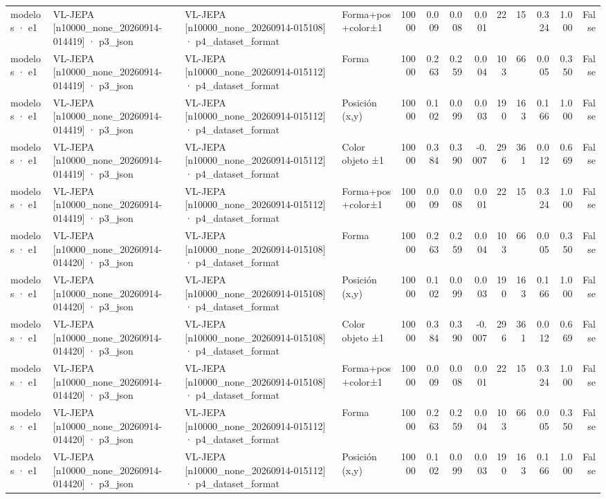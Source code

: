 \begin{tabular}{llllrrrrrrrrr}
modelos · e1 & VL-JEPA [n10000\_none\_20260914-014419] · p3\_json & VL-JEPA [n10000\_none\_20260914-015108] · p4\_dataset\_format & Forma+pos+color±1 & 10000 & 0.009 & 0.008 & 0.001 & 22 & 15 & 0.324 & 1.000 & False \\
modelos · e1 & VL-JEPA [n10000\_none\_20260914-014419] · p3\_json & VL-JEPA [n10000\_none\_20260914-015112] · p4\_dataset\_format & Forma & 10000 & 0.263 & 0.259 & 0.004 & 103 & 66 & 0.005 & 0.350 & False \\
modelos · e1 & VL-JEPA [n10000\_none\_20260914-014419] · p3\_json & VL-JEPA [n10000\_none\_20260914-015112] · p4\_dataset\_format & Posición (x,y) & 10000 & 0.102 & 0.099 & 0.003 & 190 & 163 & 0.166 & 1.000 & False \\
modelos · e1 & VL-JEPA [n10000\_none\_20260914-014419] · p3\_json & VL-JEPA [n10000\_none\_20260914-015112] · p4\_dataset\_format & Color objeto ±1 & 10000 & 0.384 & 0.390 & -0.007 & 296 & 361 & 0.012 & 0.669 & False \\
modelos · e1 & VL-JEPA [n10000\_none\_20260914-014419] · p3\_json & VL-JEPA [n10000\_none\_20260914-015112] · p4\_dataset\_format & Forma+pos+color±1 & 10000 & 0.009 & 0.008 & 0.001 & 22 & 15 & 0.324 & 1.000 & False \\
modelos · e1 & VL-JEPA [n10000\_none\_20260914-014420] · p3\_json & VL-JEPA [n10000\_none\_20260914-015108] · p4\_dataset\_format & Forma & 10000 & 0.263 & 0.259 & 0.004 & 103 & 66 & 0.005 & 0.350 & False \\
modelos · e1 & VL-JEPA [n10000\_none\_20260914-014420] · p3\_json & VL-JEPA [n10000\_none\_20260914-015108] · p4\_dataset\_format & Posición (x,y) & 10000 & 0.102 & 0.099 & 0.003 & 190 & 163 & 0.166 & 1.000 & False \\
modelos · e1 & VL-JEPA [n10000\_none\_20260914-014420] · p3\_json & VL-JEPA [n10000\_none\_20260914-015108] · p4\_dataset\_format & Color objeto ±1 & 10000 & 0.384 & 0.390 & -0.007 & 296 & 361 & 0.012 & 0.669 & False \\
modelos · e1 & VL-JEPA [n10000\_none\_20260914-014420] · p3\_json & VL-JEPA [n10000\_none\_20260914-015108] · p4\_dataset\_format & Forma+pos+color±1 & 10000 & 0.009 & 0.008 & 0.001 & 22 & 15 & 0.324 & 1.000 & False \\
modelos · e1 & VL-JEPA [n10000\_none\_20260914-014420] · p3\_json & VL-JEPA [n10000\_none\_20260914-015112] · p4\_dataset\_format & Forma & 10000 & 0.263 & 0.259 & 0.004 & 103 & 66 & 0.005 & 0.350 & False \\
modelos · e1 & VL-JEPA [n10000\_none\_20260914-014420] · p3\_json & VL-JEPA [n10000\_none\_20260914-015112] · p4\_dataset\_format & Posición (x,y) & 10000 & 0.102 & 0.099 & 0.003 & 190 & 163 & 0.166 & 1.000 & False \\

\end{tabular}
